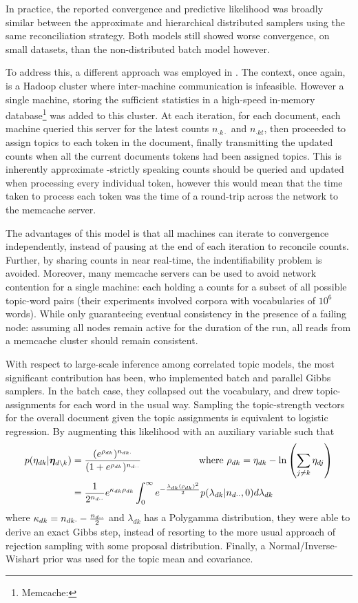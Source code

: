 In practice, the reported convergence and predictive likelihood was broadly similar between the approximate and hierarchical distributed samplers using the same reconciliation strategy. Both models still showed worse convergence, on small datasets, than the non-distributed batch model however.

To address this, a different approach was employed in \cite{Smola2010}. The context, once again, is a Hadoop cluster where inter-machine communication is infeasible. However a single machine, storing the sufficient statistics in a high-speed in-memory database\footnote{Memcache: } was added to this cluster. At each iteration, for each document, each machine queried this server for the latest counts $n_{\cdot k \cdot}$ and $n_{\cdot k t}$, then proceeded to assign topics to each token in the document, finally transmitting the updated counts when all the current documents tokens had been assigned topics. This is inherently approximate -strictly speaking counts should be queried and updated when processing every individual token, however this would mean that the time taken to process each token was the time of a round-trip across the network to the memcache server.

The advantages of this model is that all machines can iterate to convergence independently, instead of pausing at the end of each iteration to reconcile counts. Further, by sharing counts in near real-time, the indentifiability problem is avoided. Moreover, many memcache servers can be used to avoid network contention for a single machine: each holding a counts for a subset of all possible topic-word pairs (their experiments involved corpora with vocabularies of $10^6$ words). While only guaranteeing eventual consistency in the presence of a failing node: assuming all nodes remain active for the duration of the run, all reads from a memcache cluster should remain consistent. 

With respect to large-scale inference among correlated topic models, the most significant contribution has been\cite{Chen2013}, who implemented batch and parallel Gibbs samplers. In the batch case, they collapsed out the vocabulary, and drew topic-assignments for each word in the usual way. Sampling the topic-strength vectors for the overall document given the topic assignments is equivalent to logistic regression. By augmenting this likelihood with an auxiliary variable such that
\begin{align}
p(\eta_{dk} | \bm \eta_{d\setminus k}) & = \frac{(e^{\rho_{dk}})^{n_{dk\cdot}}}{(1 + e^{\rho_{dk}})^{n_{d\cdot\cdot}}} \qquad\qquad\qquad\text{where }\rho_{dk} = \eta_{dk} - \ln\left(\sum_{j \neq k} \eta_{dj}\right) \\
&= \frac{1}{2^{n_{d\cdot\cdot}}}
e^{\kappa_{dk} \rho_{dk}}
\int_0^\infty e^{-\frac{\lambda_{dk} (\rho_{dk})^2}{2}} p(\lambda_{dk}|n_{d\cdot\cdot},0) d\lambda_{dk} 
\end{align}
where $\kappa_{dk} = n_{dk\cdot} - \frac{n_{d\cdot\cdot}}{2}$ and $\lambda_{dk}$ has a Polygamma distribution, they were able to derive an exact Gibbs step, instead of resorting to the more usual approach of rejection sampling with some proposal distribution. Finally, a Normal/Inverse-Wishart prior was used for the topic mean and covariance.

